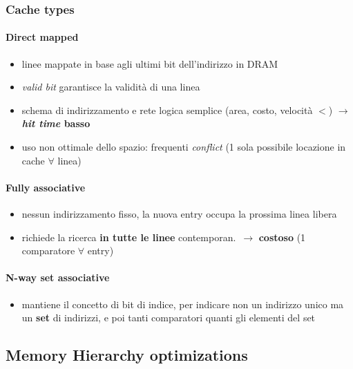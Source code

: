 \subsubsection{Cache types}

\paragraph{Direct mapped}

\begin{itemize}
  \item linee mappate in base agli ultimi bit dell'indirizzo in DRAM
  \item \textit{valid bit} garantisce la validit\`a di una linea
  \item schema di indirizzamento e rete logica semplice (area, costo, velocit\`a $<$) $\rightarrow$ \textbf{\textit{hit time} basso}
  \item uso non ottimale dello spazio: frequenti \textit{conflict} (1 sola possibile locazione in cache $\forall$ linea)
\end{itemize}

\paragraph{Fully associative}

\begin{itemize}
  \item nessun indirizzamento fisso, la nuova entry occupa la prossima linea libera
  \item richiede la ricerca \textbf{in tutte le linee} contemporan.~$\rightarrow$ \textbf{costoso} (1 comparatore $\forall$ entry)
\end{itemize}

\paragraph{N-way set associative}

\begin{itemize}
  \item mantiene il concetto di bit di indice, per indicare non un indirizzo unico ma un \textbf{set} di indirizzi, e poi tanti comparatori quanti gli elementi del set 
\end{itemize}

\subsection{Memory Hierarchy optimizations}

